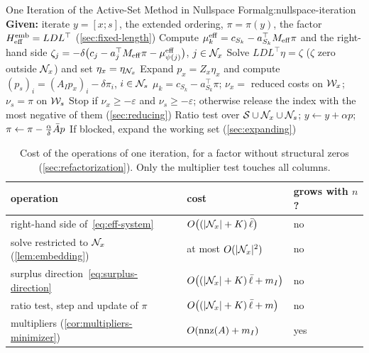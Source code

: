 \begin{algobox}{One Iteration of the Active-Set Method in Nullspace Form}{alg:nullspace-iteration}
\State \textbf{Given:} iterate $y = [x;s]$, the extended ordering, $\pi = \pi(y)$, the factor
       $H_{\mathrm{eff}}^{\mathrm{emb}} = LDL^\top$ (\cref{sec:fixed-length})
\State Compute $\mu^{\mathrm{eff}}_k = c_{S_k} - a_{S_k}^\top M_{\mathrm{eff}}\pi$ and the right-hand side
       $\zeta_j = -\delta\bigl(c_j - a_j^\top M_{\mathrm{eff}}\pi - \mu^{\mathrm{eff}}_{\psi(j)}\bigr)$, $j\in\mathcal{N}_x$
       \Comment{\eqref{eq:implicit}}
\State Solve $LDL^\top\eta = \zeta$ ($\zeta$ zero outside $\mathcal{N}_x$) and set $\eta_x = \eta_{\mathcal{N}_x}$
\State Expand $p_x = Z_x\eta_x$ and compute $(p_s)_i = (A_Ip_x)_i - \delta\pi_i$, $i\in\mathcal{N}_s$
       \Comment{\eqref{eq:direction-components}}
    \State $\mu_k = c_{S_k} - a_{S_k}^\top\pi$; \;$\nu_x = $ reduced costs on $\mathcal{W}_x$; \;$\nu_s = \pi$ on $\mathcal{W}_s$
    \State Stop if $\nu_x\ge-\varepsilon$ and $\nu_s\ge-\varepsilon$; otherwise release the index
           with the most negative of them (\cref{sec:reducing})
\Else
    \State Ratio test over $\mathcal{S}\cup\mathcal{N}_x\cup\mathcal{N}_s$; \;$y\gets y+\alpha p$; \;$\pi\gets\pi - \frac{\alpha}{\delta}\bar{A} p$
    \State If blocked, expand the working set (\cref{sec:expanding})
\EndIf
\end{algobox}

\begin{table}[ht]
\centering
\renewcommand{\arraystretch}{1.25}
\begin{tabular}{lll}
\toprule
operation & cost & grows with $n$? \\
\midrule
right-hand side of~\eqref{eq:eff-system} & $O\bigl((|\mathcal{N}_x|+K)\,\bar\ell\bigr)$ & no \\
solve restricted to $\mathcal{N}_x$ (\cref{lem:embedding}) & at most $O(|\mathcal{N}_x|^2)$ & no \\
surplus direction~\eqref{eq:surplus-direction} & $O\bigl((|\mathcal{N}_x|+K)\,\bar\ell + m_I\bigr)$ & no \\
ratio test, step and update of $\pi$ & $O\bigl((|\mathcal{N}_x|+K)\,\bar\ell + m\bigr)$ & no \\
multipliers (\cref{cor:multipliers-minimizer}) & $O(\operatorname{nnz}(A) + m_I)$ & yes \\
\bottomrule
\end{tabular}
\caption{Cost of the operations of one iteration, for a factor without structural zeros
(\cref{sec:refactorization}). Only the multiplier test touches all columns.}
\label{tab:costs}
\end{table}
